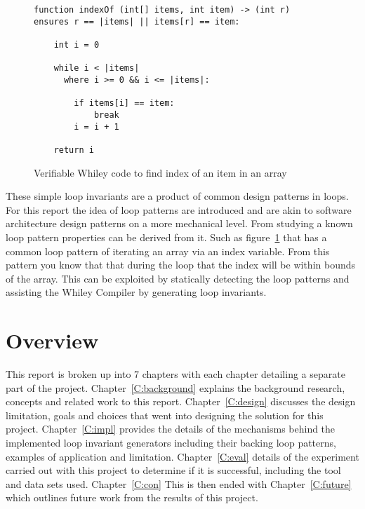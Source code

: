 \begin{figure}[ht]
\begin{lstlisting}
function indexOf (int[] items, int item) -> (int r)
ensures r == |items| || items[r] == item:

    int i = 0

    while i < |items|
      where i >= 0 && i <= |items|:

        if items[i] == item:
            break
        i = i + 1

    return i
\end{lstlisting}
\caption{Verifiable Whiley code to find index of an item in an array}
\label{lst:whiley-ex-1}
\end{figure}

These simple loop invariants are a product of common design patterns in loops.
For this report the idea of loop patterns are introduced and are akin to
software architecture design patterns on a more mechanical level.
From studying a known loop pattern properties can be derived from it.
Such as figure~\ref{lst:whiley-ex-1} that has a common loop pattern of
iterating an array via an index variable.
From this pattern you know that that during the loop that the index will be
within bounds of the array.
This can be exploited by statically detecting the loop patterns and assisting
the Whiley Compiler by generating loop invariants.

\section{Overview}

This report is broken up into 7 chapters with each chapter detailing a separate part of the project.
Chapter~\ref{C:background} explains the background research, concepts and related work to this report.
Chapter~\ref{C:design} discusses the design limitation, goals and choices that went into designing the
solution for this project.
Chapter~\ref{C:impl} provides the details of the mechanisms behind the implemented 
loop invariant generators including their backing loop patterns, examples of application and limitation.
Chapter~\ref{C:eval} details of the experiment carried out with this project to determine if it is
successful, including the tool and data sets used. 
Chapter~\ref{C:con} 
This is then ended with Chapter~\ref{C:future} which outlines future work from the results of this project.
